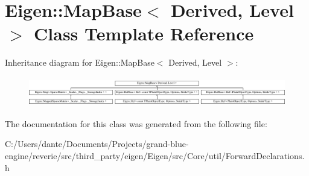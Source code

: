 \hypertarget{class_eigen_1_1_map_base}{}\section{Eigen\+::Map\+Base$<$ Derived, Level $>$ Class Template Reference}
\label{class_eigen_1_1_map_base}
Inheritance diagram for Eigen\+::Map\+Base$<$ Derived, Level $>$\+:\begin{figure}[H]
\begin{center}
\leavevmode
\includegraphics[height=1.305361cm]{class_eigen_1_1_map_base}
\end{center}
\end{figure}


The documentation for this class was generated from the following file\+:\begin{DoxyCompactItemize}
\item 
C\+:/\+Users/dante/\+Documents/\+Projects/grand-\/blue-\/engine/reverie/src/third\+\_\+party/eigen/\+Eigen/src/\+Core/util/Forward\+Declarations.\+h\end{DoxyCompactItemize}
